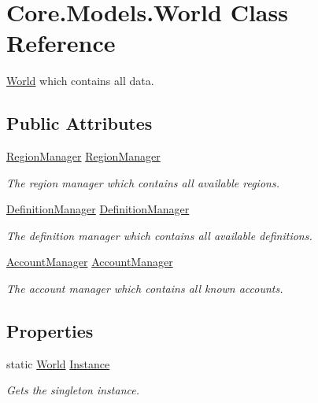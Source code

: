 \hypertarget{classCore_1_1Models_1_1World}{}\section{Core.\+Models.\+World Class Reference}
\label{classCore_1_1Models_1_1World}


\hyperlink{classCore_1_1Models_1_1World}{World} which contains all data.  


\subsection*{Public Attributes}
\begin{DoxyCompactItemize}
\item 
\hyperlink{classCore_1_1Models_1_1RegionManager}{Region\+Manager} \hyperlink{classCore_1_1Models_1_1World_a768e4edfe667a4f55d93a7c5dfd297ba}{Region\+Manager}
\begin{DoxyCompactList}\small\item\em The region manager which contains all available regions. \end{DoxyCompactList}\item 
\hyperlink{classCore_1_1Models_1_1DefinitionManager}{Definition\+Manager} \hyperlink{classCore_1_1Models_1_1World_abcc61c9fa6e9d269a6e6ff1c04ddb1ca}{Definition\+Manager}
\begin{DoxyCompactList}\small\item\em The definition manager which contains all available definitions. \end{DoxyCompactList}\item 
\hyperlink{classCore_1_1Models_1_1AccountManager}{Account\+Manager} \hyperlink{classCore_1_1Models_1_1World_a9d17871a1c75acf406833c0d0e1eb4ef}{Account\+Manager}
\begin{DoxyCompactList}\small\item\em The account manager which contains all known accounts. \end{DoxyCompactList}\end{DoxyCompactItemize}
\subsection*{Properties}
\begin{DoxyCompactItemize}
\item 
static \hyperlink{classCore_1_1Models_1_1World}{World} \hyperlink{classCore_1_1Models_1_1World_a1eb55db6738031929ddbca1b9aea971e}{Instance}
\begin{DoxyCompactList}\small\item\em Gets the singleton instance. \end{DoxyCompactList}\end{DoxyCompactItemize}



